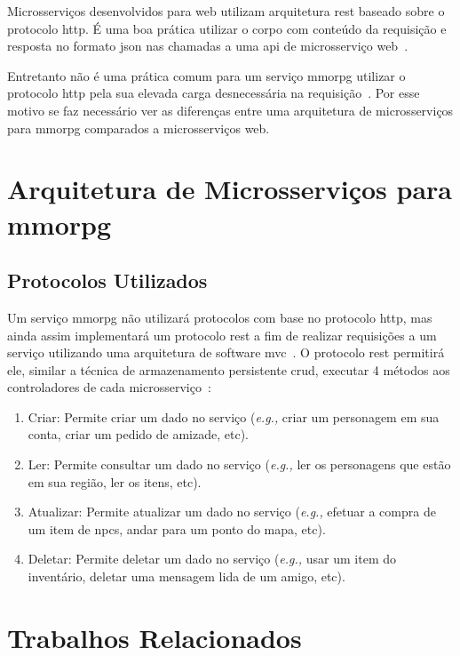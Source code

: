 Microsserviços desenvolvidos para web utilizam arquitetura \ac{rest} baseado sobre o protocolo \ac{http}.
%
É uma boa prática utilizar o corpo com conteúdo da requisição e resposta no formato \ac{json} nas chamadas a uma \ac{api} de microsserviço web~\cite{Nadareishvili2016Aug}.



Entretanto não é uma prática comum para um serviço \ac{mmorpg} utilizar o protocolo \ac{http} pela sua elevada carga desnecessária na requisição~\cite{1417630}.
%
Por esse motivo se faz necessário ver as diferenças entre uma arquitetura de microsserviços para \ac{mmorpg} comparados a microsserviços web.



\section{Arquitetura de Microsserviços para \ac{mmorpg}}



\subsection{Protocolos Utilizados}



Um serviço \ac{mmorpg} não utilizará protocolos com base no protocolo \ac{http}, mas ainda assim implementará um protocolo \ac{rest} a fim de realizar requisições a um serviço utilizando uma arquitetura de software \ac{mvc}~\cite{Chadwick2012Oct, LeckyThompson2008Nov}.
%
O protocolo \ac{rest} permitirá ele, similar a técnica de armazenamento persistente \ac{crud}, executar 4 métodos aos controladores de cada microsserviço~\cite{6267019}:



\begin{enumerate}
  \item Criar: Permite criar um dado no serviço (\textit{e.g.,} criar um personagem em sua conta, criar um pedido de amizade, etc).
  \item Ler: Permite consultar um dado no serviço (\textit{e.g.,} ler os personagens que estão em sua região, ler os itens, etc).
  \item Atualizar: Permite atualizar um dado no serviço (\textit{e.g.,} efetuar a compra de um item de \ac{npcs}, andar para um ponto do mapa, etc).
  \item Deletar: Permite deletar um dado no serviço (\textit{e.g.,} usar um item do inventário, deletar uma mensagem lida de um amigo, etc).
\end{enumerate}


\section{Trabalhos Relacionados}
\label{sec:similares}
